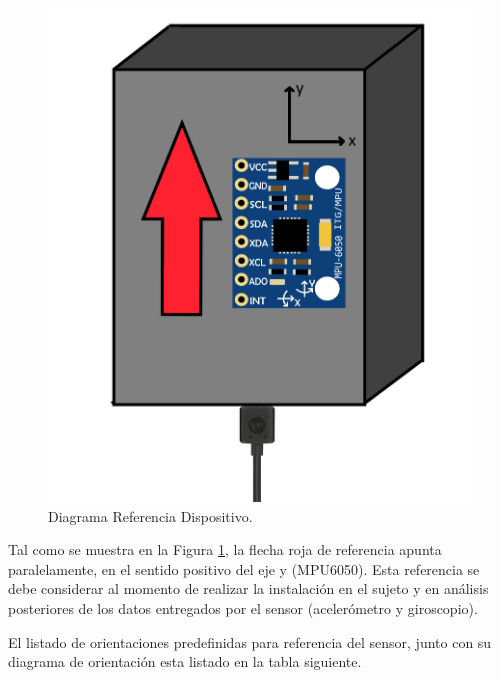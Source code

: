 \documentclass[12pt,a4paper]{article}
\begin{document}
\begin{figure}[H]
	\centering
	\includegraphics[scale=0.2]{images/referenciaDispositivo}
	\caption{Diagrama Referencia Dispositivo.}
	\label{fig:referenciaDisp}
\end{figure}

Tal como se muestra en la Figura \ref{fig:referenciaDisp}, la flecha roja de referencia apunta paralelamente, en el sentido positivo del eje y (MPU6050).
Esta referencia se debe considerar al momento de realizar la instalación en el sujeto y en análisis posteriores de los datos entregados por el sensor (acelerómetro y giroscopio).

\newpage

El listado de orientaciones predefinidas para referencia del sensor, junto con su diagrama de orientación esta listado en la tabla siguiente.
\end{document}
